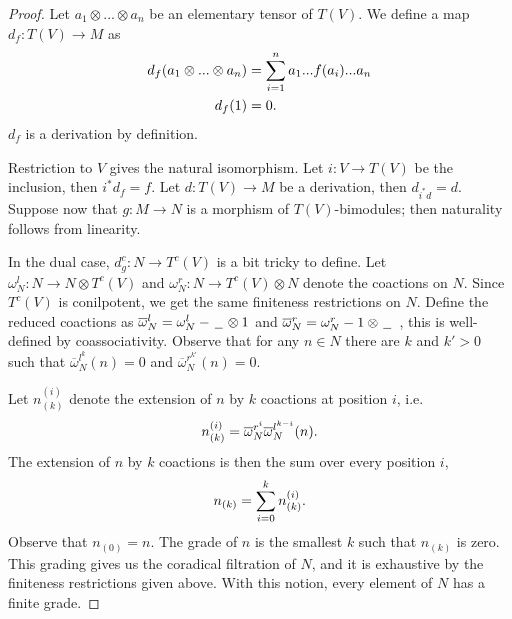 \documentclass[../thesis.tex]{subfiles}
\begin{document}
            \begin{proof}
                Let $a_1\otimes ... \otimes a_n$ be an elementary tensor of $T(V)$. We define a map $d_f : T(V) \rightarrow M$ as
                \begin{align*}
                    d_f(a_1\otimes ... \otimes a_n) & = \sum_{i=1}^n a_1...f(a_i)...a_n \\
                    d_f(1) & = 0\tt{.} 
                \end{align*}
                $d_f$ is a derivation by definition.
                
                Restriction to $V$ gives the natural isomorphism. Let $i : V\rightarrow T(V)$ be the inclusion, then $i^*d_f = f$. Let $d : T(V) \rightarrow M$ be a derivation, then $d_{i^*d}=d$. Suppose now that $g: M \rightarrow N$ is a morphism of $T(V)$-bimodules; then naturality follows from linearity. 

                In the dual case, $d_g^c: N \rightarrow T^c(V)$ is a bit tricky to define. Let $\omega^l_N:N\rightarrow N\otimes T^c(V)$ and $\omega^r_N : N\rightarrow T^c(V) \otimes N$ denote the coactions on $N$. Since $T^c(V)$ is conilpotent, we get the same finiteness restrictions on $N$. Define the reduced coactions as $\overline{\omega}^l_N = \omega^l_N - \argument\otimes 1$ and $\overline{\omega}^r_N = \omega^r_N - 1\otimes\argument\ $, this is well-defined by coassociativity. Observe that for any $n\in N$ there are $k$ and $k'>0$ such that ${\overline{\omega}^{l^k}_N}(n) = 0$ and ${\overline{\omega}^{r^{k'}}_N}(n)=0$.

                Let $n_{(k)}^{(i)}$ denote the extension of $n$ by $k$ coactions at position $i$, i.e. 
                \begin{align*}
                    n_{(k)}^{(i)} = \overline{\omega}^{r^i}_N\overline{\omega}^{l^{k-i}}_N(n)\tt{.} 
                \end{align*}
                The extension of $n$ by $k$ coactions is then the sum over every position $i$,
                \begin{align*}
                    n_{(k)} = \sum_{i=0}^kn_{(k)}^{(i)}\tt{.}
                \end{align*} 
                Observe that $n_{(0)} = n$. The grade of $n$ is the smallest $k$ such that $n_{(k)}$ is zero. This grading gives us the coradical filtration of $N$, and it is exhaustive by the finiteness restrictions given above. With this notion, every element of $N$ has a finite grade.


\end{proof}
\end{document}
